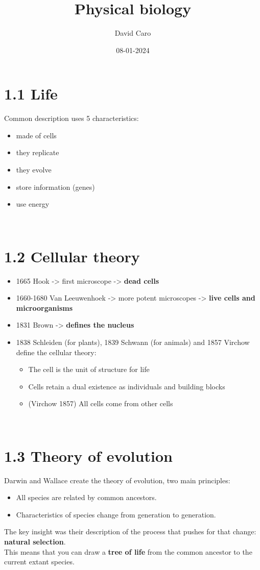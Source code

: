 \documentclass[a4paper,landscape,10pt]{cheatsheet}
\title{Physical biology}
\author{David Caro}
\date{08-01-2024}
\begin{document}
\maketitle

\section{1.1 Life}
Common description uses 5 characteristics:
\begin{itemize}
  \item made of cells
  \item they replicate
  \item they evolve
  \item store information (genes)
  \item use energy
\end{itemize}

\hfill\\
\section{1.2 Cellular theory}
\begin{itemize}
  \item 1665 Hook -> first microscope -> \textbf{dead cells}\\
  \item 1660-1680 Van Leeuwenhoek -> more potent microscopes -> \textbf{live cells and microorganisms}\\
  \item 1831 Brown -> \textbf{defines the nucleus}\\
  \item 1838 Schleiden (for plants), 1839 Schwann (for animals) and 1857 Virchow define the cellular theory:
        \begin{itemize}
          \item The cell is the unit of structure for life
          \item Cells retain a dual existence as individuals and building blocks
          \item (Virchow 1857) All cells come from other cells
        \end{itemize}
\end{itemize}

\hfill\\
\section{1.3 Theory of evolution}
Darwin and Wallace create the theory of evolution, two main principles:
\begin{itemize}
  \item All species are related by common ancestors.
  \item Characteristics of species change from generation to generation.
\end{itemize}
The key insight was their description of the process that pushes for that change: \textbf{natural selection}.\\
This means that you can draw a \textbf{tree of life} from the common ancestor to the current extant species.
\end{document}
